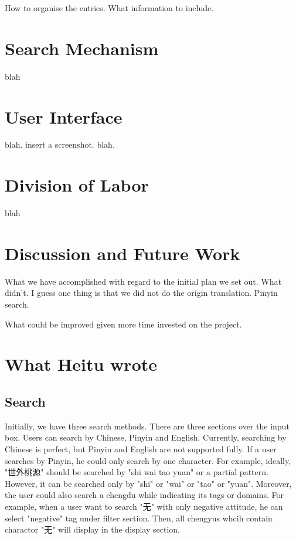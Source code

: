 \documentclass[11pt]{article} %
\begin{document}
\indent How to organise the entries. What information to include. \\

\section{Search Mechanism}

\indent blah\\

\section{User Interface}

\indent blah. insert a screenshot. blah.\\

\section{Division of Labor}

\indent blah\\

\section{Discussion and Future Work}
\indent What we have accomplished with regard to the initial plan we set out. What didn't. I guess one thing is that we did not do the origin translation. Pinyin search.

\indent What could be improved given more time invested on the project. 

\section{What Heitu wrote}
\subsection{Search}
\indent Initially, we have three search methods. There are three sections over the input box. Users can search by Chinese, Pinyin and English. Currently, searching by Chinese is perfect, but Pinyin and English are not supported fully. If a user searches by Pinyin, he could only search by one character. For example, ideally, "世外桃源" should be searched by "shi wai tao yuan" or a partial pattern. However, it can be searched only by "shi" or "wai" or "tao" or "yuan". Moreover, the user could also search a chengdu while indicating its tags or domains. For example, when a user want to search "无" with only negative attitude, he can select "negative" tag under filter section. Then, all chengyus whcih contain charactor "无" will display in the display section. 
\end{document}
